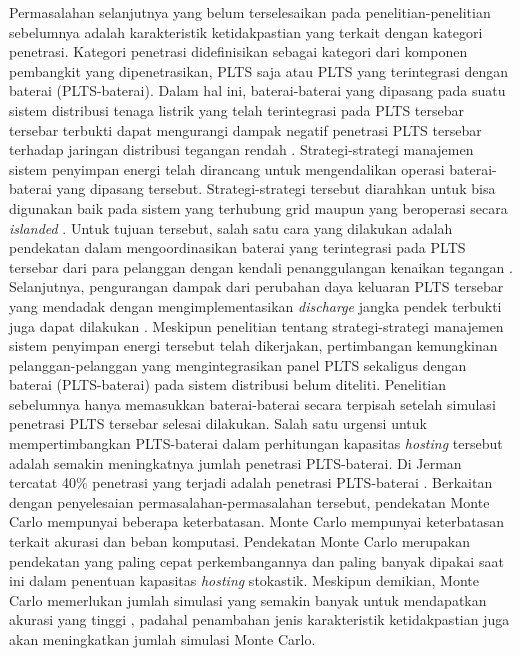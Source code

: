 Permasalahan selanjutnya yang belum terselesaikan pada penelitian-penelitian sebelumnya adalah karakteristik ketidakpastian yang terkait dengan kategori penetrasi. Kategori penetrasi didefinisikan sebagai kategori dari komponen pembangkit yang dipenetrasikan, PLTS saja atau PLTS yang terintegrasi dengan baterai (PLTS-baterai). Dalam hal ini, baterai-baterai yang dipasang pada suatu sistem distribusi tenaga listrik yang telah terintegrasi pada PLTS tersebar tersebar terbukti dapat mengurangi dampak negatif penetrasi PLTS tersebar terhadap jaringan distribusi tegangan rendah \cite{mokhtari_smart_2013,alam_mitigation_2013,tran_robust_2019}. Strategi-strategi manajemen sistem penyimpan energi telah dirancang untuk mengendalikan operasi baterai-baterai yang dipasang tersebut. Strategi-strategi tersebut diarahkan untuk bisa digunakan baik pada sistem yang terhubung grid maupun yang beroperasi secara \textit{islanded} \cite{tran_robust_2019}. Untuk tujuan tersebut, salah satu cara yang dilakukan adalah pendekatan dalam mengoordinasikan baterai yang terintegrasi pada PLTS tersebar dari para pelanggan dengan kendali penanggulangan kenaikan tegangan \cite{mokhtari_smart_2013}. Selanjutnya, pengurangan dampak dari perubahan daya keluaran PLTS tersebar yang mendadak dengan mengimplementasikan \textit{discharge} jangka pendek terbukti juga dapat dilakukan \cite{alam_mitigation_2013}. Meskipun penelitian tentang strategi-strategi manajemen sistem penyimpan energi tersebut telah dikerjakan, pertimbangan kemungkinan pelanggan-pelanggan yang mengintegrasikan panel PLTS sekaligus dengan baterai (PLTS-baterai) pada sistem distribusi belum diteliti. Penelitian sebelumnya hanya memasukkan baterai-baterai secara terpisah setelah simulasi penetrasi PLTS tersebar selesai dilakukan. Salah satu urgensi untuk mempertimbangkan PLTS-baterai dalam perhitungan kapasitas \textit{hosting} tersebut adalah semakin meningkatnya jumlah penetrasi PLTS-baterai. Di Jerman tercatat 40\% penetrasi yang terjadi adalah penetrasi PLTS-baterai \cite{international_renewable_energy_agency_renewable_2020}. Berkaitan dengan penyelesaian permasalahan-permasalahan tersebut, pendekatan Monte Carlo mempunyai beberapa keterbatasan. Monte Carlo mempunyai keterbatasan terkait akurasi dan beban komputasi. Pendekatan Monte Carlo merupakan pendekatan yang paling cepat perkembangannya dan paling banyak dipakai saat ini dalam penentuan kapasitas \textit{hosting} stokastik. Meskipun demikian, Monte Carlo memerlukan jumlah simulasi yang semakin banyak untuk mendapatkan akurasi yang tinggi \cite{dubey_estimation_2017}, padahal penambahan jenis karakteristik ketidakpastian juga akan meningkatkan jumlah simulasi Monte Carlo.

